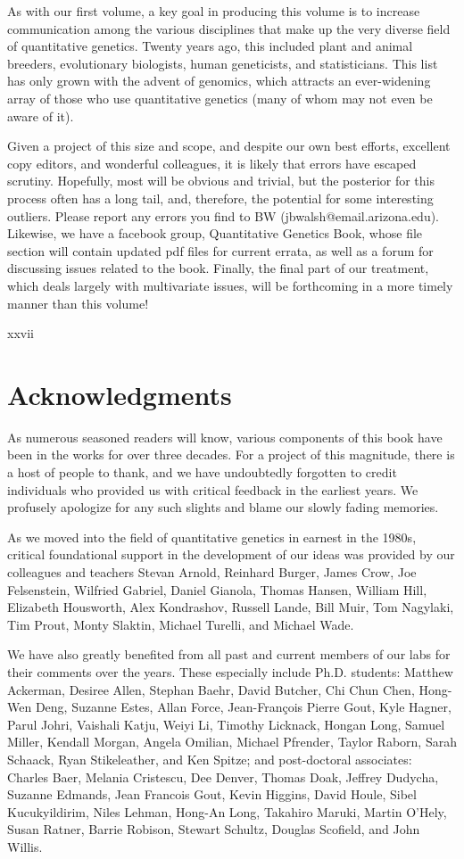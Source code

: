 \documentclass{article}
\begin{document}
As with our first volume, a key goal in producing this volume is to increase communication among the various disciplines that make up the very diverse field of quantitative genetics. Twenty years ago, this included plant and animal breeders, evolutionary biologists, human geneticists, and statisticians. This list has only grown with the advent of genomics, which attracts an ever-widening array of those who use quantitative genetics (many of whom may not even be aware of it).

Given a project of this size and scope, and despite our own best efforts, excellent copy editors, and wonderful colleagues, it is likely that errors have escaped scrutiny. Hopefully, most will be obvious and trivial, but the posterior for this process often has a long tail, and, therefore, the potential for some interesting outliers. Please report any errors you find to BW (jbwalsh@email.arizona.edu). Likewise, we have a facebook group, Quantitative Genetics Book, whose file section will contain updated pdf files for current errata, as well as a forum for discussing issues related to the book. Finally, the final part of our treatment, which deals largely with multivariate issues, will be forthcoming in a more timely manner than this volume!

xxvii

\section{Acknowledgments}
As numerous seasoned readers will know, various components of this book have been in the works for over three decades. For a project of this magnitude, there is a host of people to thank, and we have undoubtedly forgotten to credit individuals who provided us with critical feedback in the earliest years. We profusely apologize for any such slights and blame our slowly fading memories.

As we moved into the field of quantitative genetics in earnest in the 1980s, critical foundational support in the development of our ideas was provided by our colleagues and teachers Stevan Arnold, Reinhard Burger, James Crow, Joe Felsenstein, Wilfried Gabriel, Daniel Gianola, Thomas Hansen, William Hill, Elizabeth Housworth, Alex Kondrashov, Russell Lande, Bill Muir, Tom Nagylaki, Tim Prout, Monty Slaktin, Michael Turelli, and Michael Wade.

We have also greatly benefited from all past and current members of our labs for their comments over the years. These especially include Ph.D. students: Matthew Ackerman, Desiree Allen, Stephan Baehr, David Butcher, Chi Chun Chen, Hong-Wen Deng, Suzanne Estes, Allan Force, Jean-François Pierre Gout, Kyle Hagner, Parul Johri, Vaishali Katju, Weiyi Li, Timothy Licknack, Hongan Long, Samuel Miller, Kendall Morgan, Angela Omilian, Michael Pfrender, Taylor Raborn, Sarah Schaack, Ryan Stikeleather, and Ken Spitze; and post-doctoral associates: Charles Baer, Melania Cristescu, Dee Denver, Thomas Doak, Jeffrey Dudycha, Suzanne Edmands, Jean Francois Gout, Kevin Higgins, David Houle, Sibel Kucukyildirim, Niles Lehman, Hong-An Long, Takahiro Maruki, Martin O'Hely, Susan Ratner, Barrie Robison, Stewart Schultz, Douglas Scofield, and John Willis.
\end{document}

